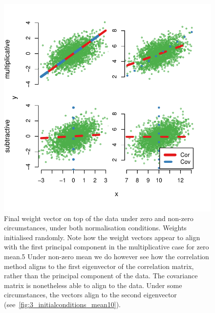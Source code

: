 \documentclass[10pt]{article}\usepackage[]{graphicx}\usepackage[]{color}
\makeatletter
\def\maxwidth{ %
  \ifdim\Gin@nat@width>\linewidth
    \linewidth
  \else
    \Gin@nat@width
  \fi
}
\theoremstyle{plain}
\makeatother
\begin{document}
\begin{multicols*}{2}
\begin{Schunk}
\begin{figure}[H]
{\centering \includegraphics[width=\maxwidth]{../figures/twocolumn-3_alignments-1} 

}

\caption{Final weight vector on top of the data under zero and non-zero circumstances, under both normalisation conditions. Weights initialised randomly. Note how the weight vectors appear to align with the first principal component in the multiplicative case for zero mean.5 Under non-zero mean we do however see how the correlation method aligns to the first eigenvector of the correlation matrix, rather than the principal component of the data. The covariance matrix is nonetheless able to align to the data. Under some circumstances, the vectors align to the second eigenvector (see~\cref{fig:3_initialconditions_mean10}).}\label{fig:3_alignments}
\end{figure}
\end{Schunk}

\begin{Schunk}
\begin{figure}[H]


\end{figure}
\end{Schunk}
\end{multicols*}
\end{document}
